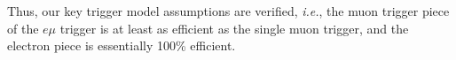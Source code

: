 Thus, our key trigger model assumptions are verified, {\em i.e.}, the
muon trigger piece of the $e\mu$ trigger is at least as efficient 
as the single muon trigger, and the electron piece is essentially
100\% efficient.

